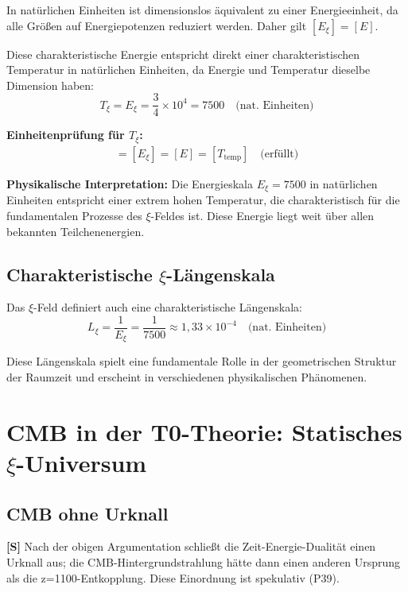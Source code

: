 	In natürlichen Einheiten ist dimensionslos äquivalent zu einer Energieeinheit, da alle Größ{}en auf Energiepotenzen reduziert werden. Daher gilt $[E_\xi] = [E]$.
	
	Diese charakteristische Energie entspricht direkt einer charakteristischen Temperatur in natürlichen Einheiten, da Energie und Temperatur dieselbe Dimension haben:
	\begin{equation}
		T_\xi = E_\xi = \frac{3}{4} \times 10^4 = 7500 \quad \text{(nat. Einheiten)}
	\end{equation}
	
	\textbf{Einheitenprüfung für $T_\xi$:}
	\begin{align}
		[T_\xi] = [E_\xi] = [E] = [T_{\text{temp}}] \quad \text{(erfüllt)}
	\end{align}
	
	\textbf{Physikalische Interpretation:} Die Energieskala $E_\xi = 7500$ in natürlichen Einheiten entspricht einer extrem hohen Temperatur, die charakteristisch für die fundamentalen Prozesse des $\xi$-Feldes ist. Diese Energie liegt weit über allen bekannten Teilchenenergien.
	
	\subsection{Charakteristische $\xi$-Längenskala}
	
	Das $\xi$-Feld definiert auch eine charakteristische Längenskala:
	\begin{equation}
		L_\xi = \frac{1}{E_\xi} = \frac{1}{7500} \approx 1,33 \times 10^{-4} \quad \text{(nat. Einheiten)}
	\end{equation}
	
	Diese Längenskala spielt eine fundamentale Rolle in der geometrischen Struktur der Raumzeit und erscheint in verschiedenen physikalischen Phänomenen.
	
	\section{CMB in der T0-Theorie: Statisches $\xi$-Universum}
	
	\subsection{CMB ohne Urknall}
	
	\begin{important}
		\textbf{[S]} Nach der obigen Argumentation schließt die Zeit-Energie-Dualität einen Urknall aus; die CMB-Hintergrundstrahlung hätte dann einen anderen Ursprung als die z=1100-Entkopplung. Diese Einordnung ist spekulativ (P39).
	\end{important}
	
